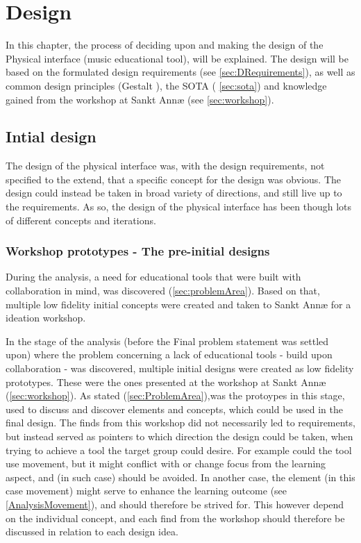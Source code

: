 \chapter{Design}

In this chapter, the process of deciding upon and making the design of the Physical interface (music educational tool), will be explained. The design will be based on the formulated design requirements (see \autoref{sec:DRequirements}), as well as common design principles (Gestalt \cite{gestalt}), the SOTA ( \autoref{sec:sota}) and knowledge gained from the workshop at Sankt Annæ (see \autoref{sec:workshop}). 


\section{Intial design}
The design of the physical interface was, with the design requirements, not specified to the extend, that a specific concept for the design was obvious. The design could instead be taken in broad variety of directions, and still live up to the requirements. As so, the design of the physical interface has been though lots of different concepts and iterations. 

\subsection {Workshop prototypes - The pre-initial designs}
During the analysis, a need for educational tools that were built with collaboration in mind, was discovered (\autoref{sec:problemArea}). Based on that, multiple low fidelity initial concepts were created and taken to Sankt Annæ for a ideation workshop.

In the stage of the analysis (before the Final problem statement was settled upon) where the problem concerning a lack of educational tools - build upon collaboration - was discovered, multiple initial designs were created as low fidelity prototypes. These were the ones presented at the workshop at Sankt Annæ (\autoref{sec:workshop}). As stated (\autoref{sec:ProblemArea}),was the protoypes in this stage, used to discuss and discover elements and concepts, which could be used in the final design. The finds from this workshop did not necessarily led to requirements, but instead served as pointers to which direction the design could be taken, when trying to achieve a tool the target group could desire. For example could the tool use movement, but it might conflict with or change focus from the learning aspect, and (in such case) should be avoided. In another case, the element (in this case movement) might serve to enhance the learning outcome (see \autoref{AnalysisMovement}), and should therefore be strived for. This however depend on the individual concept, and each find from the workshop should therefore be discussed in relation to each design idea. 
\\\\

